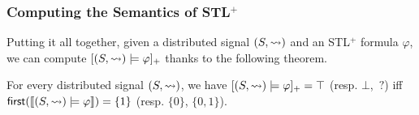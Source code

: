 \subsubsection{Computing the Semantics of STL$^+$}

Putting it all together, given a distributed signal $(S, {\rightsquigarrow})$ and an STL$^+$ formula $\varphi$, we can compute $[(S,{\rightsquigarrow}) \models \varphi]_+$ thanks to the following theorem.

\begin{theorem} \label{cl:algo}
	For every distributed signal $(S,{\rightsquigarrow})$, we have $[(S,{\rightsquigarrow}) \models \varphi]_+ = \top$ (resp. $\bot$, ${\,?}$) iff $\textsf{first}(\llbracket (S, {\rightsquigarrow}) \models \varphi \rrbracket) = \{1\}$ (resp. $\{0\}$, $\{0,1\}$).
\end{theorem}

%	
%	
%	
%	


